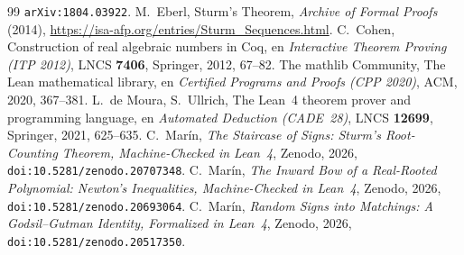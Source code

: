 \documentclass[11pt]{article}
\begin{document}
\begin{thebibliography}{99}
\texttt{arXiv:1804.03922}.
 M.~Eberl, Sturm's Theorem, \emph{Archive of Formal Proofs} (2014),
\url{https://isa-afp.org/entries/Sturm_Sequences.html}.
 C.~Cohen, Construction of real algebraic numbers in Coq, en \emph{Interactive Theorem
Proving (ITP 2012)}, LNCS \textbf{7406}, Springer, 2012, 67--82.
 The mathlib Community, The Lean mathematical library, en \emph{Certified Programs and
Proofs (CPP 2020)}, ACM, 2020, 367--381.
 L.~de Moura, S.~Ullrich, The Lean~4 theorem prover and programming language, en
\emph{Automated Deduction (CADE~28)}, LNCS \textbf{12699}, Springer, 2021, 625--635.
 C.~Mar\'in, \emph{The Staircase of Signs: Sturm's Root-Counting Theorem,
Machine-Checked in Lean~4}, Zenodo, 2026, \texttt{doi:10.5281/zenodo.20707348}.
 C.~Mar\'in, \emph{The Inward Bow of a Real-Rooted Polynomial: Newton's Inequalities,
Machine-Checked in Lean~4}, Zenodo, 2026, \texttt{doi:10.5281/zenodo.20693064}.
 C.~Mar\'in, \emph{Random Signs into Matchings: A Godsil--Gutman Identity, Formalized
in Lean~4}, Zenodo, 2026, \texttt{doi:10.5281/zenodo.20517350}.
\end{thebibliography}
\end{document}
